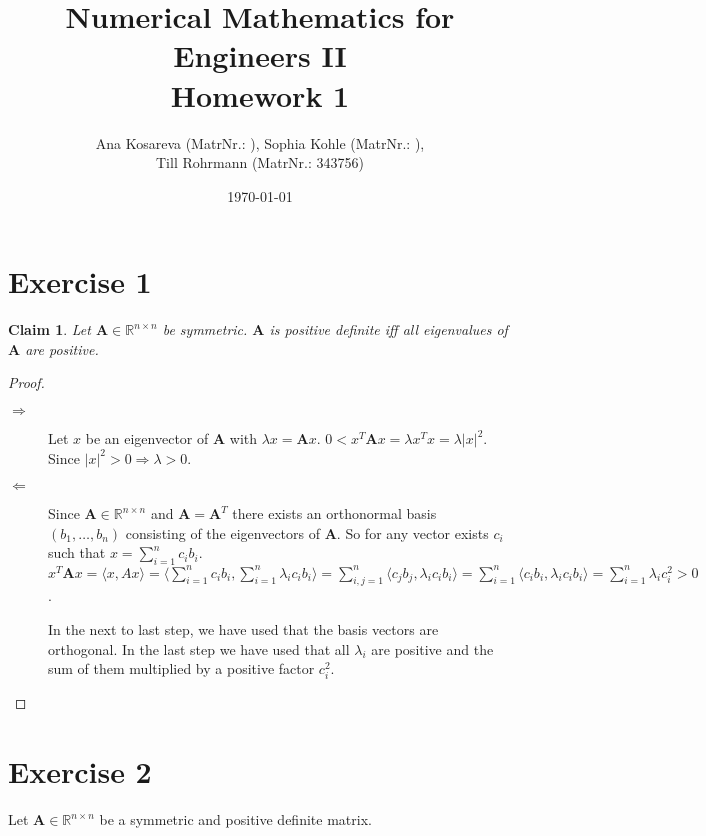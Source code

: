 \documentclass{article}
\title{Numerical Mathematics for Engineers II\\Homework 1}
\author{Ana Kosareva (MatrNr.: ), Sophia Kohle (MatrNr.: ),\\ Till Rohrmann (MatrNr.: 343756)}
\date{\today}
\newtheorem{claim}{Claim}
\begin{document}
\maketitle

\section*{Exercise 1}
	\begin{claim}
		Let $\pmb A \in \mathbb{R}^{n\times n}$ be symmetric. $\pmb A$ is positive definite iff all eigenvalues of $\pmb A$ are positive.
	\end{claim}
	\begin{proof}
		\begin{description}
			\item[$\Rightarrow$] Let $x$ be an eigenvector of $\pmb A$ with $\lambda x = \pmb A x$. $0 < x^{T}\pmb A x = \lambda x^{T}x = \lambda |x|^{2}$. Since $|x|^{2} > 0 \Rightarrow \lambda > 0$.
			\item[$\Leftarrow$] Since $\pmb A \in \mathbb{R}^{n\times n}$ and $\pmb A = \pmb A^{T}$ there exists an orthonormal basis $(b_{1},\ldots, b_{n})$ consisting of the eigenvectors of $\pmb A$. So for any vector exists $c_{i}$ such that $x=\sum_{i=1}^{n}c_{i}b_{i}$. $x^{T}\pmb A x = \langle x,Ax \rangle = \langle \sum_{i=1}^{n}c_{i}b_{i},\sum_{i=1}^{n}\lambda_{i}c_{i}b_{i}\rangle = \sum_{i,j=1}^{n}\langle c_{j}b_{j}, \lambda_{i}c_{i}b_{i} \rangle = \sum_{i=1}^{n} \langle c_{i}b_{i},\lambda_{i}c_{i}b_{i}\rangle = \sum_{i=1}^{n} \lambda_{i} c_{i}^{2} > 0$.
			
			In the next to last step, we have used that the basis vectors are orthogonal. In the last step we have used that all $\lambda_{i}$ are positive and the sum of them multiplied by a positive factor $c_{i}^{2}$.
		\end{description}
	\end{proof}
	
\section*{Exercise 2}
	Let $\pmb A \in \mathbb{R}^{n\times n}$ be a symmetric and positive definite matrix.
\end{document}
